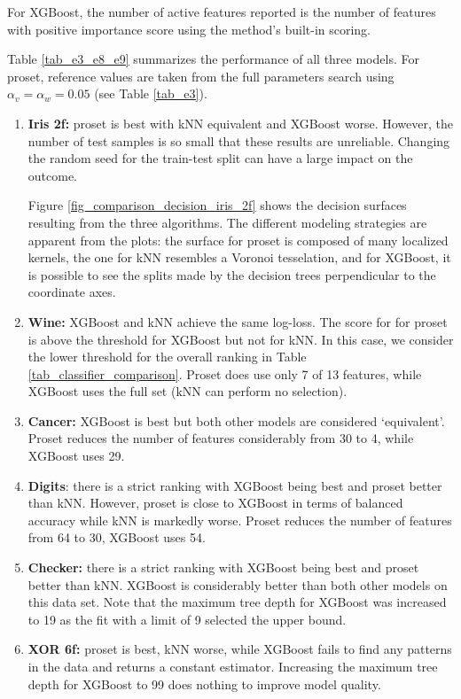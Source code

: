 For XGBoost, the number of active features reported is the number of features with positive importance score using the method's built-in scoring.\par
%
Table \ref{tab_e3_e8_e9} summarizes the performance of all three models.
For proset, reference values are taken from the full parameters search using $\alpha_v=\alpha_w=0.05$ (see Table \ref{tab_e3}).\par
%
\begin{enumerate}
\item\textbf{Iris 2f:} proset is best with kNN equivalent and XGBoost worse.
However, the number of test samples is so small that these results are unreliable.
Changing the random seed for the train-test split can have a large impact on the outcome.\par
%
Figure \ref{fig_comparison_decision_iris_2f} shows the decision surfaces resulting from the three algorithms.
The different modeling strategies are apparent from the plots: the surface for proset is composed of many localized kernels, the one for kNN resembles a Voronoi tesselation, and for XGBoost, it is possible to see the splits made by the decision trees perpendicular to the coordinate axes.
%
\item\textbf{Wine:} XGBoost and kNN achieve the same log-loss.
The score for for proset is above the threshold for XGBoost but not for kNN.
In this case, we consider the lower threshold for the overall ranking in Table \ref{tab_classifier_comparison}.
Proset does use only 7 of 13 features, while XGBoost uses the full set (kNN can perform no selection).
%
\item\textbf{Cancer:} XGBoost is best but both other models are considered `equivalent'.
Proset reduces the number of features considerably from 30 to 4, while XGBoost uses 29.
%
\item\textbf{Digits}: there is a strict ranking with XGBoost being best and proset better than kNN.
However, proset is close to XGBoost in terms of balanced accuracy while kNN is markedly worse.
Proset reduces the number of features from 64 to 30, XGBoost uses 54.
%
\item\textbf{Checker:} there is a strict ranking with XGBoost being best and proset better than kNN.
XGBoost is considerably better than both other models on this data set.
Note that the maximum tree depth for XGBoost was increased to 19 as the fit with a limit of 9 selected the upper bound.
%
\item\textbf{XOR 6f:} proset is best, kNN worse, while XGBoost fails to find any patterns in the data and returns a constant estimator.
Increasing the maximum tree depth for XGBoost to 99 does nothing to improve model quality.
\end{enumerate}
